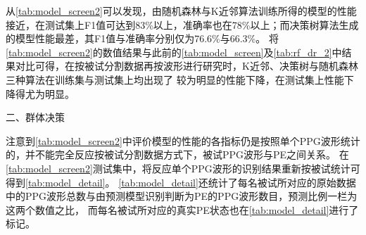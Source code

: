 从\autoref{tab:model_screen2}可以发现，由随机森林与K近邻算法训练所得的模型的性能接近，在测试集上F1值可达到83\%以上，准确率也在78\%以上；而决策树算法生成的模型性能最差，其F1值与准确率分别仅为76.6\%与66.3\%。
将\autoref{tab:model_screen2}的数值结果与此前的\autoref{tab:model_screen}及\autoref{tab:rf_dr_2}中结果对比可得，在按被试分割数据再按波形进行研究时，K近邻、决策树与随机森林三种算法在训练集与测试集上均出现了
较为明显的性能下降，在测试集上性能下降得尤为明显。

二、群体决策

注意到\autoref{tab:model_screen2}中评价模型的性能的各指标仍是按照单个PPG波形统计的，并不能完全反应按被试分割数据方式下，被试PPG波形与PE之间关系。
在\autoref{tab:model_screen2}测试集中，将反应单个PPG波形的识别结果重新按被试统计可得到\autoref{tab:model_detail}。
\autoref{tab:model_detail}还统计了每名被试所对应的原始数据中的PPG波形总数与由预测模型识别判断为PE的PPG波形数目，预测比例一栏为这两个数值之比，
而每名被试所对应的真实PE状态也在\autoref{tab:model_detail}进行了标记。
